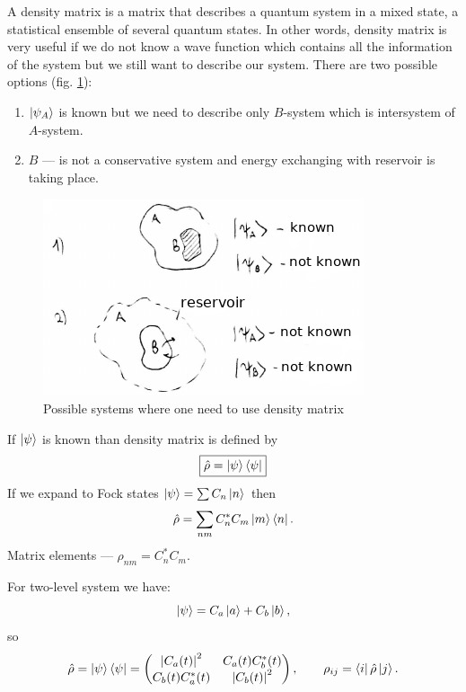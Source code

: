 A density matrix is a matrix that describes a quantum system in a mixed state, a statistical ensemble of several quantum states. In other words, density matrix is very useful if we do not know a wave function which contains all the information of the system but we still want to describe our system. There are two possible options (fig. \ref{fig:densmatr}):
\begin{enumerate}
	\item $\left\lvert {\psi_A} \right\rangle$ is known but we need to describe only $B$-system which is intersystem of $A$-system.
	\item $B$ --- is not a conservative system and energy exchanging with reservoir is taking place.
\end{enumerate}
\begin{figure}
	\centering
	\includegraphics[width=0.7\linewidth]{fig/L5/dens_matr}
	\caption{Possible systems where one need to use density matrix}
	\label{fig:densmatr}
\end{figure}
If $\left\lvert {\psi} \right\rangle$ is known than density matrix is defined by
\begin{equation}
	\boxed{\hat{\rho} = \left\lvert {\psi} \right\rangle \left\langle {\psi} \right\rvert}
\end{equation}
If we expand to Fock states $\left\lvert {\psi} \right\rangle = \sum C_n \left\lvert {n} \right\rangle$ then 
\begin{equation}
	\hat{\rho} = \sum_{nm} C_n^* C_m \left\lvert {m} \right\rangle \left\langle {n} \right\rvert.
\end{equation}
Matrix elements --- $\rho_{nm} = C_n^* C_m$.

\begin{testexample}
	For two-level system we have:
	\begin{equation}
		\left\lvert {\psi} \right\rangle = C_a \left\lvert {a} \right\rangle + C_b \left\lvert {b} \right\rangle,
	\end{equation}
	so
	\begin{equation}
		\hat{\rho} = \left\lvert {\psi} \right\rangle \left\langle {\psi} \right\rvert = 
		\begin{pmatrix}
			\left| C_a (t) \right|^2 & C_a (t) C_b^*(t) \\
			C_b (t) C_a^*(t) & \left| C_b (t) \right|^2
		\end{pmatrix}, \qquad
		\rho_{ij} = \left\langle {i} \right\rvert \hat{\rho} \left\lvert {j} \right\rangle.
	\end{equation}
\end{testexample}

